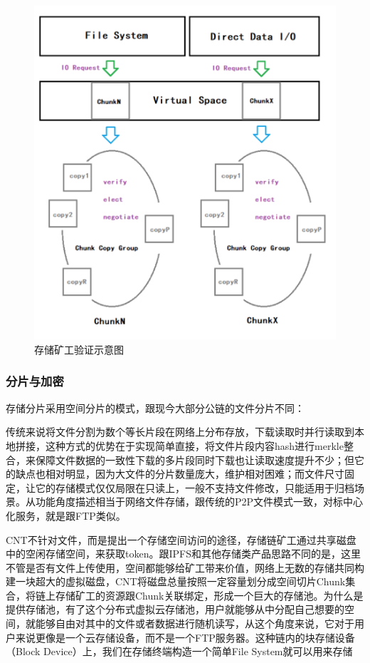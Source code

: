 \documentclass[a4paper,12pt]{article}
\begin{document}
\begin {figure} [htbp]
\centering \includegraphics [width = 5in] {pic_cn/storage_verify.png}
\caption {存储矿工验证示意图} \label {fig: d3}
\end {figure}

\subsubsection{分片与加密}

存储分片采用空间分片的模式，跟现今大部分公链的文件分片不同：

传统来说将文件分割为数个等长片段在网络上分布存放，下载读取时并行读取到本地拼接，这种方式的优势在于实现简单直接，将文件片段内容hash进行merkle整合，来保障文件数据的一致性下载的多片段同时下载也让读取速度提升不少；但它的缺点也相对明显，因为大文件的分片数量庞大，维护相对困难；而文件尺寸固定，让它的存储模式仅仅局限在只读上，一般不支持文件修改，只能适用于归档场景。从功能角度描述相当于网络文件存储，跟传统的P2P文件模式一致，对标中心化服务，就是跟FTP类似。

CNT不针对文件，而是提出一个存储空间访问的途径，存储链矿工通过共享磁盘中的空闲存储空间，来获取token。跟IPFS和其他存储类产品思路不同的是，这里不管是否有文件上传使用，空间都能够给矿工带来价值，网络上无数的存储共同构建一块超大的虚拟磁盘，CNT将磁盘总量按照一定容量划分成空间切片Chunk集合，将链上存储矿工的资源跟Chunk关联绑定，形成一个巨大的存储池。为什么是提供存储池，有了这个分布式虚拟云存储池，用户就能够从中分配自己想要的空间，就能够自由对其中的文件或者数据进行随机读写，从这个角度来说，它对于用户来说更像是一个云存储设备，而不是一个FTP服务器。这种链内的块存储设备（Block Device）上，我们在存储终端构造一个简单File System就可以用来存储
\end{document}

